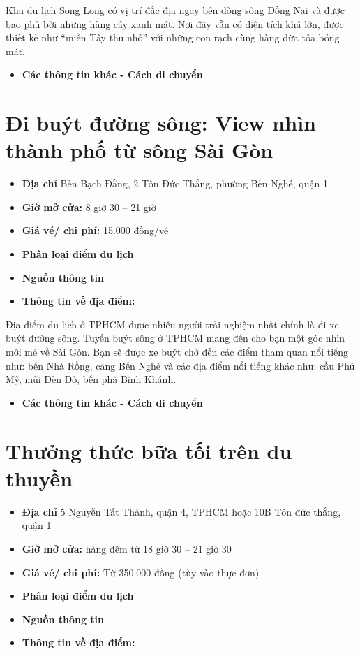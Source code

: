 \documentclass{article}
\begin{document}
Khu du lịch Song Long có vị trí đắc địa ngay bên dòng sông Đồng Nai và được bao phủ bởi những hàng cây xanh mát. Nơi đây vẫn có diện tích khá lớn, được thiết kế như “miền Tây thu nhỏ” với những con rạch cùng hàng dừa tỏa bóng mát.

\begin{itemize}
    \item{\textbf{Các thông tin khác - Cách di chuyển}}
\end{itemize}

\section{Đi buýt đường sông: View nhìn thành phố từ sông Sài Gòn}
\begin{itemize}
    \item{\textbf{Địa chỉ}} Bến Bạch Đằng, 2 Tôn Đức Thắng, phường Bến Nghé, quận 1
    \item{\textbf{Giờ mở cửa:}} 8 giờ 30 – 21 giờ
    \item{\textbf{Giá vé/ chi phí:}} 15.000 đồng/vé
    \item{\textbf{Phân loại điểm du lịch} }
    \item{\textbf{Nguồn thông tin}}
    \item{\textbf{Thông tin về địa điểm:}}
\end{itemize}

Địa điểm du lịch ở TPHCM được nhiều người trải nghiệm nhất chính là đi xe buýt đường sông. Tuyến buýt sông ở TPHCM mang đến cho bạn một góc nhìn mới mẻ về Sài Gòn. Bạn sẽ được xe buýt chở đến các điểm tham quan nổi tiếng như: bến Nhà Rồng, cảng Bến Nghé và các địa điểm nổi tiếng khác như: cầu Phú Mỹ, mũi Đèn Đỏ, bến phà Bình Khánh.

\begin{itemize}
    \item{\textbf{Các thông tin khác - Cách di chuyển}}
\end{itemize}

\section{Thưởng thức bữa tối trên du thuyền}
\begin{itemize}
    \item{\textbf{Địa chỉ}} 5 Nguyễn Tất Thành, quận 4, TPHCM hoặc 10B Tôn đức thắng, quận 1
    \item{\textbf{Giờ mở cửa:}} hàng đêm từ 18 giờ 30 – 21 giờ 30
    \item{\textbf{Giá vé/ chi phí:}} Từ 350.000 đồng (tùy vào thực đơn)
    \item{\textbf{Phân loại điểm du lịch} }
    \item{\textbf{Nguồn thông tin}}
    \item{\textbf{Thông tin về địa điểm:}}
\end{itemize}
\end{document}
